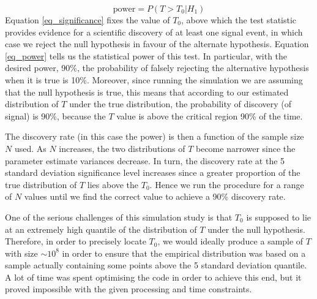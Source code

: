 \documentclass[12pt]{article}
\begin{document}
\begin{equation}
\label{eq_power}
    \text{power} = P(T>T_0|H_1)
\end{equation}
Equation \eqref{eq_significance} fixes the value of $T_0$, above which the test statistic provides evidence for a scientific discovery of at least one signal event, in which case we reject the null hypothesis in favour of the alternate hypothesis.
Equation \eqref{eq_power} tells us the statistical power of this test.
In particular, with the desired power, 90\%, the probability of falsely rejecting the alternative hypothesis when it is true is 10\%.
Moreover, since running the simulation we are assuming that the null hypothesis is true, this means that according to our estimated distribution of $T$ under the true distribution, the probability of discovery (of signal) is 90\%, because the $T$ value is above the critical region 90\% of the time.

The discovery rate (in this case the power) is then a function of the sample size $N$ used.
As $N$ increases, the two distributions of $T$ become narrower since the parameter estimate variances decrease.
In turn, the discovery rate at the 5 standard deviation significance level increases since a greater proportion of the true distribution of $T$ lies above the $T_0$.
Hence we run the procedure for a range of $N$ values until we find the correct value to achieve a 90\% discovery rate.

One of the serious challenges of this simulation study is that $T_0$ is supposed to lie at an extremely high quantile of the distribution of $T$ under the null hypothesis.
Therefore, in order to precisely locate $T_0$, we would ideally produce a sample of $T$ with size $\sim10^8$ in order to ensure that the empirical distribution was based on a sample actually containing some points above the 5 standard deviation quantile.
A lot of time was spent optimising the code in order to achieve this end, but it proved impossible with the given processing and time constraints.
\end{document}
